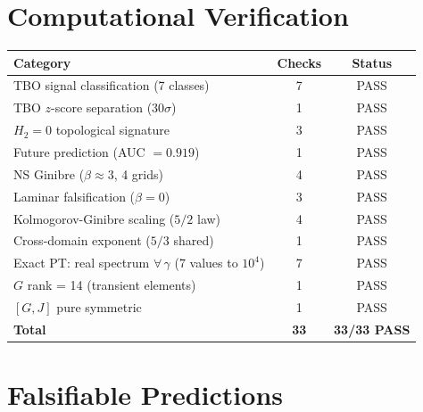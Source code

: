 \documentclass[12pt,a4paper]{article}
\theoremstyle{definition}
\theoremstyle{remark}
\newcommand{\Jcoup}{J}
\begin{document}
\section{Computational Verification}
\label{sec:verification}

\begin{center}
\begin{tabular}{lcc}
\toprule
\textbf{Category} & \textbf{Checks} & \textbf{Status} \\
\midrule
TBO signal classification (7 classes) & 7 & \textcolor{proved}{PASS} \\
TBO $z$-score separation ($30\sigma$) & 1 & \textcolor{proved}{PASS} \\
$H_2 = 0$ topological signature & 3 & \textcolor{proved}{PASS} \\
Future prediction (AUC $= 0.919$) & 1 & \textcolor{proved}{PASS} \\
NS Ginibre ($\beta \approx 3$, 4 grids) & 4 & \textcolor{proved}{PASS} \\
Laminar falsification ($\beta = 0$) & 3 & \textcolor{proved}{PASS} \\
Kolmogorov-Ginibre scaling ($5/2$ law) & 4 & \textcolor{proved}{PASS} \\
Cross-domain exponent ($5/3$ shared) & 1 & \textcolor{proved}{PASS} \\
Exact PT: real spectrum $\forall\,\gamma$ (7 values to $10^4$) & 7 & \textcolor{proved}{PASS} \\
$G$ rank = 14 (transient elements) & 1 & \textcolor{proved}{PASS} \\
$[G, \Jcoup]$ pure symmetric & 1 & \textcolor{proved}{PASS} \\
\midrule
\textbf{Total} & \textbf{33} & \textbf{33/33 PASS} \\
\bottomrule
\end{tabular}
\end{center}

\section{Falsifiable Predictions}
\label{sec:predictions}
\end{document}
